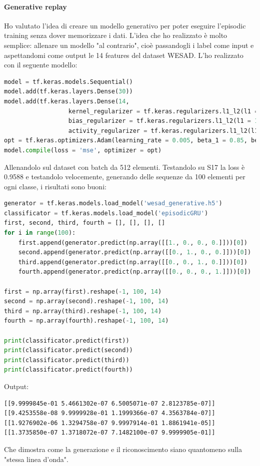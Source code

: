 \documentclass[11pt, a4paper, twoside, openright]{book}
\begin{document}
\paragraph{Generative replay} Ho valutato l'idea di creare un modello generativo per poter eseguire l'episodic training senza dover memorizzare i dati. L'idea che ho realizzato è molto semplice: allenare un modello "al contrario", cioè passandogli i label come input e aspettandomi come output le 14 features del dataset WESAD. L'ho realizzato con il seguente modello:
\begin{lstlisting}[language = Python]
model = tf.keras.models.Sequential()
model.add(tf.keras.layers.Dense(30))
model.add(tf.keras.layers.Dense(14,
                  kernel_regularizer = tf.keras.regularizers.l1_l2(l1 = 1e-6, l2 = 1e-6),
                  bias_regularizer = tf.keras.regularizers.l1_l2(l1 = 1e-4, l2 = 1e-4),
                  activity_regularizer = tf.keras.regularizers.l1_l2(l1 = 1e-4, l2 = 1e-4)))
opt = tf.keras.optimizers.Adam(learning_rate = 0.005, beta_1 = 0.85, beta_2 = 0.999)
model.compile(loss = 'mse', optimizer = opt)
\end{lstlisting}
Allenandolo sul dataset con batch da 512 elementi. Testandolo su S17 la loss è 0.9588 e testandolo velocemente, generando delle sequenze da 100 elementi per ogni classe, i risultati sono buoni:
\begin{lstlisting}[language = Python]
generator = tf.keras.models.load_model('wesad_generative.h5')
classificator = tf.keras.models.load_model('episodicGRU')
first, second, third, fourth = [], [], [], []
for i in range(100):
    first.append(generator.predict(np.array([[1., 0., 0., 0.]]))[0])
    second.append(generator.predict(np.array([[0., 1., 0., 0.]]))[0])
    third.append(generator.predict(np.array([[0., 0., 1., 0.]]))[0])
    fourth.append(generator.predict(np.array([[0., 0., 0., 1.]]))[0])

first = np.array(first).reshape(-1, 100, 14)
second = np.array(second).reshape(-1, 100, 14)
third = np.array(third).reshape(-1, 100, 14)
fourth = np.array(fourth).reshape(-1, 100, 14)

print(classificator.predict(first))
print(classificator.predict(second))
print(classificator.predict(third))
print(classificator.predict(fourth))
\end{lstlisting}
Output:
\begin{verbatim}
[[9.9999845e-01 5.4661302e-07 6.5005071e-07 2.8123785e-07]]
[[9.4253558e-08 9.9999928e-01 1.1999366e-07 4.3563784e-07]]
[[1.9276902e-06 1.3294758e-07 9.9997914e-01 1.8861941e-05]]
[[1.3735850e-07 1.3718072e-07 7.1482100e-07 9.9999905e-01]]
\end{verbatim}
Che dimostra come la generazione e il riconoscimento siano quantomeno sulla "stessa linea d'onda".
\end{document}
